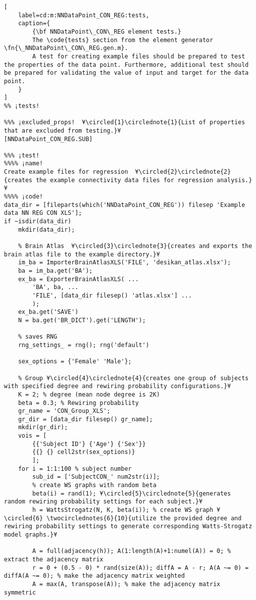 \documentclass{tufte-handout}
\begin{document}
\begin{lstlisting}[
	label=cd:m:NNDataPoint_CON_REG:tests,
	caption={
		{\bf NNDataPoint\_CON\_REG element tests.}
		The \code{tests} section from the element generator \fn{\_NNDataPoint\_CON\_REG.gen.m}.
		A test for creating example files should be prepared to test the properties of the data point. Furthermore, additional test should be prepared for validating the value of input and target for the data point.
	}
]			
%% ¡tests!

%%% ¡excluded_props!  ¥\circled{1}\circlednote{1}{List of properties that are excluded from testing.}¥
[NNDataPoint_CON_REG.SUB]

%%% ¡test!
%%%% ¡name!
Create example files for regression  ¥\circled{2}\circlednote{2}{creates the example connectivity data files for regression analysis.}¥
%%%% ¡code!
data_dir = [fileparts(which('NNDataPoint_CON_REG')) filesep 'Example data NN REG CON XLS'];
if ~isdir(data_dir)
    mkdir(data_dir);

    % Brain Atlas  ¥\circled{3}\circlednote{3}{creates and exports the brain atlas file to the example directory.}¥
    im_ba = ImporterBrainAtlasXLS('FILE', 'desikan_atlas.xlsx');
    ba = im_ba.get('BA');
    ex_ba = ExporterBrainAtlasXLS( ...
        'BA', ba, ...
        'FILE', [data_dir filesep() 'atlas.xlsx'] ...
        );
    ex_ba.get('SAVE')
    N = ba.get('BR_DICT').get('LENGTH');

    % saves RNG
    rng_settings_ = rng(); rng('default')

    sex_options = {'Female' 'Male'};

    % Group ¥\circled{4}\circlednote{4}{creates one group of subjects with specified degree and rewiring probability configurations.}¥
    K = 2; % degree (mean node degree is 2K)
    beta = 0.3; % Rewiring probability
    gr_name = 'CON_Group_XLS';
    gr_dir = [data_dir filesep() gr_name];
    mkdir(gr_dir);
    vois = [
        {{'Subject ID'} {'Age'} {'Sex'}}
        {{} {} cell2str(sex_options)}
        ];
    for i = 1:1:100 % subject number
        sub_id = ['SubjectCON_' num2str(i)];
        % create WS graphs with random beta
        beta(i) = rand(1); ¥\circled{5}\circlednote{5}{generates random rewiring probability settings for each subject.}¥
        h = WattsStrogatz(N, K, beta(i)); % create WS graph ¥\circled{6} \twocirclednotes{6}{10}{utilize the provided degree and rewiring probability settings to generate corresponding Watts-Strogatz model graphs.}¥

        A = full(adjacency(h)); A(1:length(A)+1:numel(A)) = 0; % extract the adjacency matrix
        r = 0 + (0.5 - 0) * rand(size(A)); diffA = A - r; A(A ~= 0) = diffA(A ~= 0); % make the adjacency matrix weighted
        A = max(A, transpose(A)); % make the adjacency matrix symmetric


\end{lstlisting}
\end{document}
